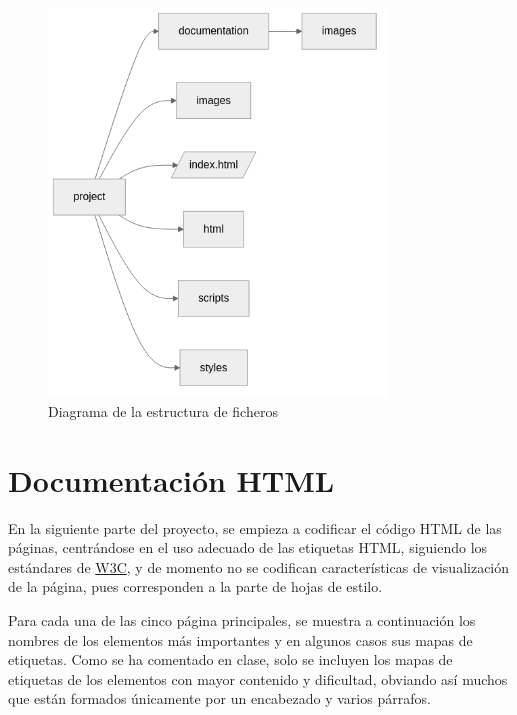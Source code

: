 \documentclass[11pt, a4paper]{book}
\begin{document}
	\begin{figure} [H]
		\centering
		\includegraphics[width=0.8\textwidth]{estructura_ficheros.png}
		\caption{Diagrama de la estructura de ficheros}
	\end{figure}
	
	
	
	
	
	
	
	
	
	
	\chapter{Documentación HTML}
	
	En la siguiente parte del proyecto, se empieza a codificar el código HTML de las páginas, centrándose en el uso adecuado de las etiquetas HTML, siguiendo los estándares de \href{https://html.spec.whatwg.org/multipage/}{W3C}, y de momento no se codifican características de visualización de la página, pues corresponden a la parte de hojas de estilo. 
	
	Para cada una de las cinco página principales, se muestra a continuación los nombres de los elementos más importantes y en algunos casos sus mapas de etiquetas. Como se ha comentado en clase, solo se incluyen los mapas de etiquetas de los elementos con mayor contenido y dificultad, obviando así muchos que están formados únicamente por un encabezado y varios párrafos.
\end{document}

